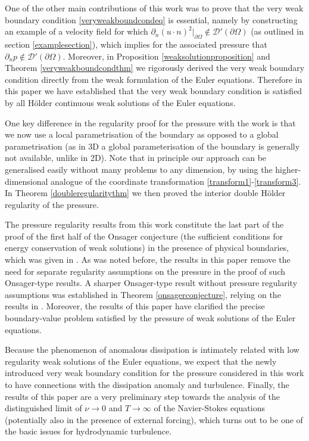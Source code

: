 \documentclass[12pt,a4paper]{article}
\theoremstyle{definition}
\theoremstyle{remark}
\numberwithin{equation}{section}
\begin{document}
One of the other main contributions of this work was to prove that the very weak boundary condition \eqref{veryweakboundcondeq} is essential, namely by constructing an example of a velocity field for which $\partial_n (u \cdot n)^2 \lvert_{\partial \Omega} \notin \mathcal{D}' (\partial \Omega)$ (as outlined in section \ref{examplesection}), which implies for the associated pressure that $\partial_n p \notin \mathcal{D}' (\partial \Omega)$. Moreover, in Proposition \ref{weaksolutionproposition} and Theorem \ref{veryweakboundcondthm} we rigorously derived the very weak boundary condition directly from the weak formulation of the Euler equations. Therefore in this paper we have established that the very weak boundary condition is satisfied by all Hölder continuous weak solutions of the Euler equations.

One key difference in the regularity proof for the pressure with the work \cite{bardos2021} is that we now use a local parametrisation of the boundary as opposed to a global parametrisation (as in 3D a global parameterisation of the boundary is generally not available, unlike in 2D). Note that in principle our approach can be generalised easily without many problems to any dimension, by using the higher-dimensional analogue of the coordinate transformation \eqref{transform1}-\eqref{transform3}. In Theorem \ref{doubleregularitythm} we then proved the interior double Hölder regularity of the pressure.

The pressure regularity results from this work constitute the last part of the proof of the first half of the Onsager conjecture (the sufficient conditions for energy conservation of weak solutions) in the presence of physical boundaries, which was given in \cite{titi2018}. As was noted before, the results in this paper remove the need for separate regularity assumptions on the pressure in the proof of such Onsager-type results. A sharper Onsager-type result without pressure regularity assumptions was established in Theorem \ref{onsagerconjecture}, relying on the results in \cite{titi2019}. Moreover, the results of this paper have clarified the precise boundary-value problem satisfied by the pressure of weak solutions of the Euler equations. 

Because the phenomenon of anomalous dissipation is intimately related with low regularity weak solutions of the Euler equations, we expect that the newly introduced very weak boundary condition for the pressure considered in this work to have connections with the dissipation anomaly and turbulence. Finally, the results of this paper are a very preliminary step towards the analysis of the distinguished limit of $\nu\rightarrow 0$ and $T\rightarrow \infty$ of the Navier-Stokes equations (potentially also in the presence of external forcing), which turns out to be one of the basic issues for hydrodynamic turbulence.
\end{document}
